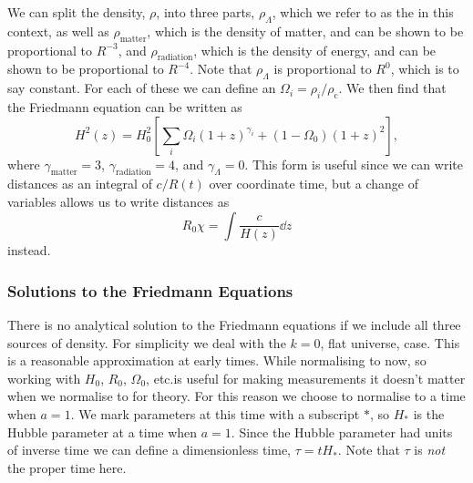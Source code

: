 \documentclass[fleqn]{NotesClass}
\begin{document}
    We can split the density, \(\rho\), into three parts, \(\rho_{\Lambda}\), which we refer to as the  in this context, as well as \(\rho_{\mathrm{matter}}\), which is the density of matter, and can be shown to be proportional to \(R^{-3}\), and \(\rho_{\mathrm{radiation}}\), which is the density of energy, and can be shown to be proportional to \(R^{-4}\).
    Note that \(\rho_{\Lambda}\) is proportional to \(R^0\), which is to say constant.
    For each of these we can define an \(\Omega_i = \rho_i/\rho_{\mathrm{c}}\).
    We then find that the Friedmann equation can be written as
    \begin{equation}
        H^2(z) = H_0^2\left[ \sum_{i} \Omega_i(1 + z)^{\gamma_i} + (1 - \Omega_0)(1 + z)^2 \right],
    \end{equation}
    where \(\gamma_{\mathrm{matter}} = 3\), \(\gamma_{\mathrm{radiation}} = 4\), and \(\gamma_{\Lambda} = 0\).
    This form is useful since we can write distances as an integral of \(c/R(t)\) over coordinate time, but a change of variables allows us to write distances as
    \begin{equation}
        R_0\chi = \int \frac{c}{H(z)}\dd{z}
    \end{equation}
    instead.
    
    \subsubsection{Solutions to the Friedmann Equations}
    There is no analytical solution to the Friedmann equations if we include all three sources of density.
    For simplicity we deal with the \(k = 0\), flat universe, case.
    This is a reasonable approximation at early times.
    While normalising to now, so working with \(H_0\), \(R_0\), \(\Omega_0\), etc.\@ is useful for making measurements it doesn't matter when we normalise to for theory.
    For this reason we choose to normalise to a time when \(a = 1\).
    We mark parameters at this time with a subscript \(*\), so \(H_*\) is the Hubble parameter at a time when \(a = 1\).
    Since the Hubble parameter had units of inverse time we can define a dimensionless time, \(\tau = tH_*\).
    Note that \(\tau\) is \emph{not} the proper time here.
    
\end{document}

